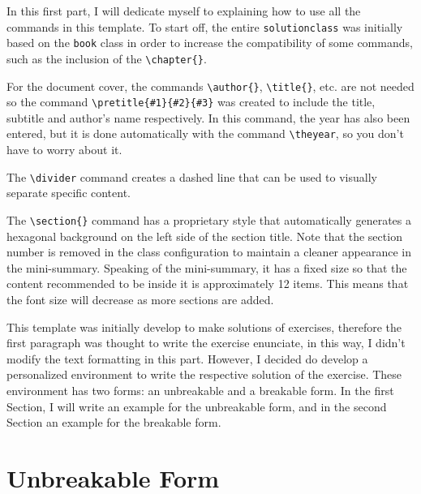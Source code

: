 In this first part, I will dedicate myself to explaining how to use all the commands in this template. To start off, the entire \verb|solutionclass| was initially based on the \verb|book| class in order to increase the compatibility of some commands, such as the inclusion of the \verb|\chapter{}|. 

    \divider

    For the document cover, the commands \verb|\author{}|, \verb|\title{}|, etc. are not needed so the command \verb|\pretitle{#1}{#2}{#3}| was created to include the title, subtitle and author's name respectively. In this command, the year has also been entered, but it is done automatically with the command \verb|\theyear|, so you don't have to worry about it.

    \divider

    The \verb|\divider| command creates a dashed line that can be used to visually separate specific content.

    \divider

    The \verb|\section{}| command has a proprietary style that automatically generates a hexagonal background on the left side of the section title. Note that the section number is removed in the class configuration to maintain a cleaner appearance in the mini-summary. Speaking of the mini-summary, it has a fixed size so that the content recommended to be inside it is approximately 12 items. This means that the font size will decrease as more sections are added.

    \divider

    This template was initially develop to make solutions of exercises, therefore the first paragraph was thought to write the exercise enunciate, in this way, I didn't modify the text formatting in this part. However, I decided do develop a personalized environment to write the respective solution of the exercise. These environment has two forms: an unbreakable and a breakable form. In the first Section, I will write an example for the unbreakable form, and in the second Section an example for the breakable form.

    \section{Unbreakable Form}\label{ex 1}
    \lipsum[1]
    
